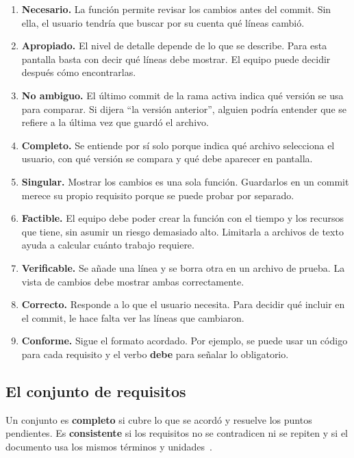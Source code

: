 \documentclass[11pt,a4paper]{article}
\begin{document}
\begin{enumerate}
  \item \textbf{Necesario.} La función permite revisar los cambios antes del
  commit. Sin ella, el usuario tendría que buscar por su cuenta qué líneas
  cambió.
  \item \textbf{Apropiado.} El nivel de detalle depende de lo que se
  describe. Para esta pantalla basta con decir qué líneas debe mostrar. El
  equipo puede decidir después cómo encontrarlas.
  \item \textbf{No ambiguo.} El último commit de la rama activa indica qué
  versión se usa para comparar. Si dijera ``la versión anterior'', alguien
  podría entender que se refiere a la última vez que guardó el archivo.
  \item \textbf{Completo.} Se entiende por sí solo porque indica qué archivo
  selecciona el usuario, con qué versión se compara y qué debe aparecer en
  pantalla.
  \item \textbf{Singular.} Mostrar los cambios es una sola función.
  Guardarlos en un commit merece su propio requisito porque se puede probar
  por separado.
  \item \textbf{Factible.} El equipo debe poder crear la función con el
  tiempo y los recursos que tiene, sin asumir un riesgo demasiado alto.
  Limitarla a archivos de texto ayuda a calcular cuánto trabajo requiere.
  \item \textbf{Verificable.} Se añade una línea y se borra otra en un
  archivo de prueba. La vista de cambios debe mostrar ambas correctamente.
  \item \textbf{Correcto.} Responde a lo que el usuario necesita. Para
  decidir qué incluir en el commit, le hace falta ver las líneas que
  cambiaron.
  \item \textbf{Conforme.} Sigue el formato acordado. Por ejemplo, se puede
  usar un código para cada requisito y el verbo \textbf{debe} para señalar
  lo obligatorio.
\end{enumerate}

\subsection*{El conjunto de requisitos}

Un conjunto es \textbf{completo} si cubre lo que se acordó y resuelve los
puntos pendientes. Es \textbf{consistente} si los requisitos no se
contradicen ni se repiten y si el documento usa los mismos términos y
unidades~\cite[Sec. 5.2.6]{iso29148}.
\end{document}
